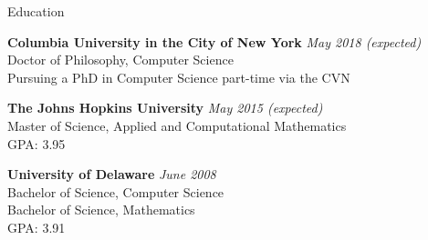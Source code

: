 \documentclass{resume} %
\begin{document}

\begin{rSection}{Education}

{\bf Columbia University in the City of New York} \hfill {\em May 2018 (expected)} \\ 
Doctor of Philosophy, Computer Science \\
Pursuing a PhD in Computer Science part-time via the CVN

{\bf The Johns Hopkins University} \hfill {\em May 2015 (expected)} \\
Master of Science, Applied and Computational Mathematics \\
GPA: 3.95

{\bf University of Delaware} \hfill {\em June 2008} \\
Bachelor of Science, Computer Science \\
Bachelor of Science, Mathematics \\
GPA: 3.91


\end{rSection}

\end{document}
